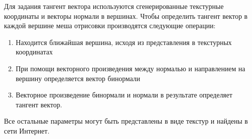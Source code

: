 	Для задания тангент вектора используются сгенерированные текстурные координаты и векторы нормали в вершинах. Чтобы определить тангент вектор в каждой вершине меша отрисовки производятся следующие операции:
	\begin{enumerate}[1.]
		\item Находится ближайшая  вершина, исходя из представления в текстурных координатах
		\item При помощи векторного произведения между нормалью и направлением на  вершину определяется вектор бинормали
		\item Векторное произведение бинормали и нормали в результате определяет тангент вектор.
	\end{enumerate}
	
	Все остальные параметры могут быть представлены в виде текстур и найдены в сети Интернет.

%
